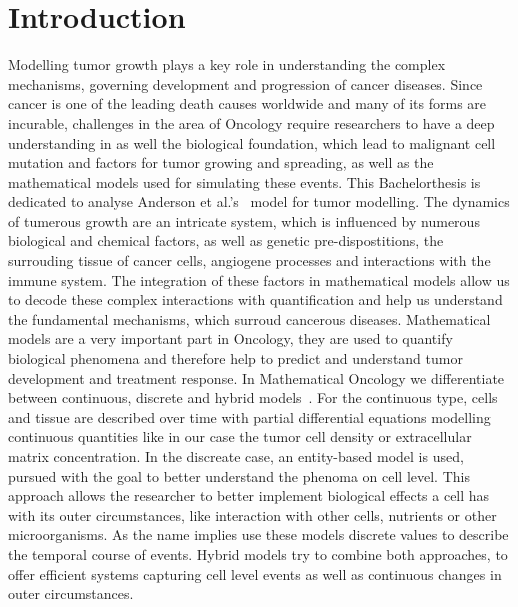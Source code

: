 \section{Introduction}
Modelling tumor growth plays a key role in understanding the complex mechanisms, governing development and progression of cancer diseases. Since cancer is one of the leading death causes worldwide and many of its forms are incurable, challenges in the area of Oncology require researchers to have a deep understanding in as well the biological foundation, which lead to malignant cell mutation and factors for tumor growing and spreading, as well as the mathematical models used for simulating these events. This Bachelorthesis is dedicated to analyse Anderson et al.'s~\cite{anderson_continuous_1998,anderson_mathematical_2000} model for tumor modelling.\newline
The dynamics of tumerous growth are an intricate system, which is influenced by numerous biological and chemical factors, as well as genetic pre-dispostitions, the surrouding tissue of cancer cells, angiogene processes and interactions with the immune system. The integration of these factors in mathematical models allow us to decode these complex interactions with quantification and help us understand the fundamental mechanisms, which surroud cancerous diseases. \newline 
Mathematical models are a very important part in Oncology,  they are used to quantify biological phenomena and therefore help to predict and understand tumor development and treatment response. In Mathematical Oncology we differentiate between continuous, discrete and hybrid models~\cite{BEKISZ2020101198}. For the continuous type, cells and tissue are described over time with partial differential equations modelling continuous quantities like in our case the tumor cell density or extracellular matrix concentration.\newline 
In the discreate case, an entity-based model is used, pursued with the goal to better understand the phenoma on cell level. This approach allows the researcher to better implement biological effects a cell has with its outer circumstances, like interaction with other cells, nutrients or other microorganisms. As the name implies use these models discrete values to describe the temporal course of events.\newline
Hybrid models try to combine both approaches, to offer efficient systems capturing cell level events as well as continuous changes in outer circumstances.\newline 
